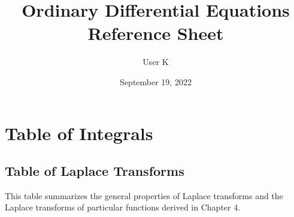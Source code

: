 \documentclass[10pt, letterpaper]{article}
\title{Ordinary Differential Equations Reference Sheet}
\author{User K}
\date{September 19, 2022}
\begin{document}
\begin{comment}
\begin{titlepage}
    \maketitle
\end{titlepage}
\end{comment}

\maketitle


\tableofcontents{}
\section{Table of Integrals}

\subsection{Table of Laplace Transforms}
This table summarizes the general properties of Laplace transforms and the Laplace transforms of particular functions derived in Chapter 4.
\end{document}
